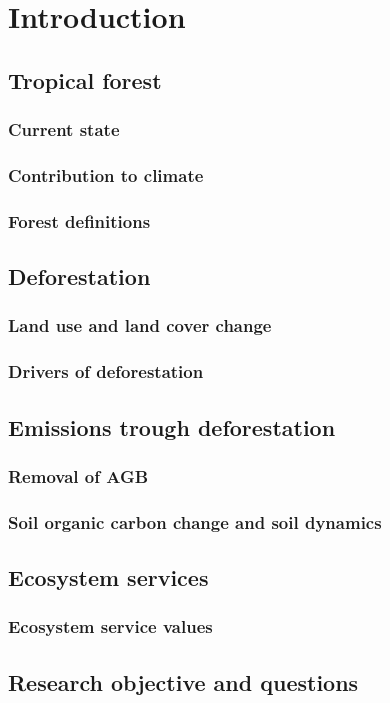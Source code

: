 \section{Introduction}
\label{sec:introduction}

\subsection{Tropical forest}
\subsubsection{Current state}
\subsubsection{Contribution to climate}
\subsubsection{Forest definitions}
\subsection{Deforestation}
\subsubsection{Land use and land cover change}
\subsubsection{Drivers of deforestation}
\subsection{Emissions trough deforestation}
\subsubsection{Removal of AGB}
\subsubsection{Soil organic carbon change and soil dynamics}
\subsection{Ecosystem services}
\subsubsection{Ecosystem service values}
\subsection{Research objective and questions}
